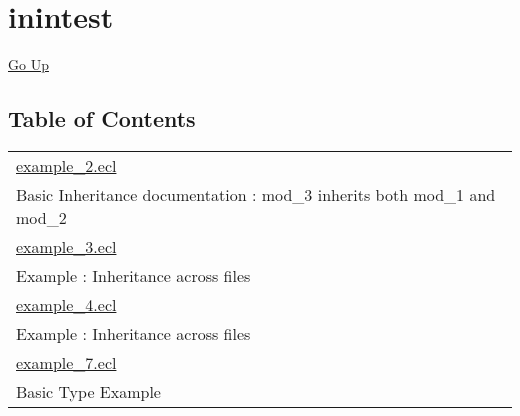 \chapter*{\color{headtoc} inintest}
\hypertarget{ecldoc:toc:root/intest/inintest}{}
\hyperlink{ecldoc:toc:}{Go Up}


\section*{Table of Contents}
{\renewcommand{\arraystretch}{1.5}
\begin{longtable}{|p{\textwidth}|}
\hline
\hyperlink{ecldoc:toc:intest.inintest.example_2}{example\_2.ecl} \\
Basic Inheritance documentation : mod\_3 inherits both mod\_1 and mod\_2 \\
\hline
\hyperlink{ecldoc:toc:intest.inintest.example_3}{example\_3.ecl} \\
Example : Inheritance across files \\
\hline
\hyperlink{ecldoc:toc:intest.inintest.example_4}{example\_4.ecl} \\
Example : Inheritance across files \\
\hline
\hyperlink{ecldoc:toc:intest.inintest.example_7}{example\_7.ecl} \\
Basic Type Example \\
\hline
\end{longtable}
}





